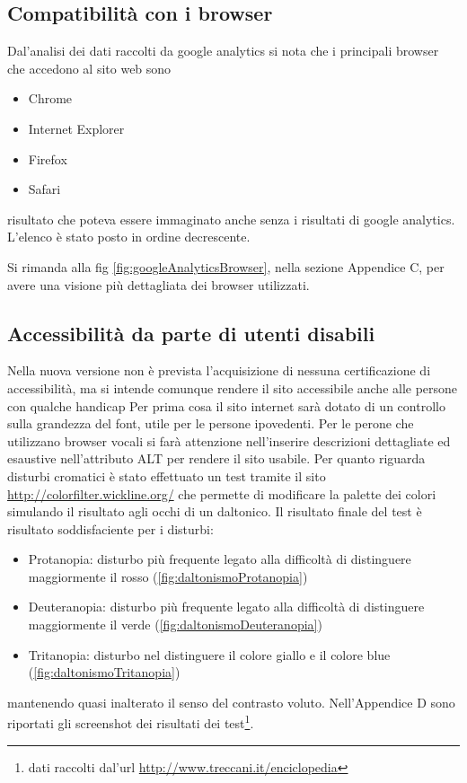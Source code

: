 \documentclass[a4paper,12pt,hidelinks]{report}
\begin{document}
  \subsection{Compatibilità con i browser}
  Dal'analisi dei dati raccolti da google analytics si nota che i principali browser che accedono al sito web sono
  \begin{itemize}
   \item Chrome
   \item Internet Explorer
   \item Firefox
   \item Safari
  \end{itemize}
  risultato che poteva essere immaginato anche senza i risultati di google analytics. L'elenco è stato posto in ordine decrescente.
  \par Si rimanda alla fig \ref{fig:googleAnalyticsBrowser}, nella sezione Appendice C, per avere una visione più dettagliata dei browser utilizzati.
  
  \subsection{Accessibilità da parte di utenti disabili}
  Nella nuova versione non è prevista l'acquisizione di nessuna certificazione di accessibilità, ma si intende comunque rendere il sito accessibile anche alle
  persone con qualche handicap
  Per prima cosa il sito internet sarà dotato di un controllo sulla grandezza del font, utile per le persone ipovedenti. Per le perone che utilizzano browser 
  vocali si farà attenzione nell'inserire descrizioni dettagliate ed esaustive nell'attributo ALT per rendere il sito usabile.
  Per quanto riguarda disturbi cromatici è stato effettuato un test tramite il sito \url{http://colorfilter.wickline.org/} che permette di modificare la palette dei colori
  simulando il risultato agli occhi di un daltonico. Il risultato finale del test è risultato soddisfaciente per i disturbi:
  \begin{itemize}
   \item Protanopia: disturbo più frequente legato alla difficoltà di distinguere maggiormente il rosso (\ref{fig:daltonismoProtanopia})
   \item Deuteranopia: disturbo più frequente legato alla difficoltà di distinguere maggiormente il verde (\ref{fig:daltonismoDeuteranopia})
   \item Tritanopia: disturbo nel distinguere il colore giallo e il colore blue (\ref{fig:daltonismoTritanopia})
  \end{itemize}
  mantenendo quasi inalterato il senso del contrasto voluto. Nell'Appendice D sono riportati gli screenshot dei risultati dei test\footnote{dati raccolti dal'url \url{http://www.treccani.it/enciclopedia}}.
\end{document}
